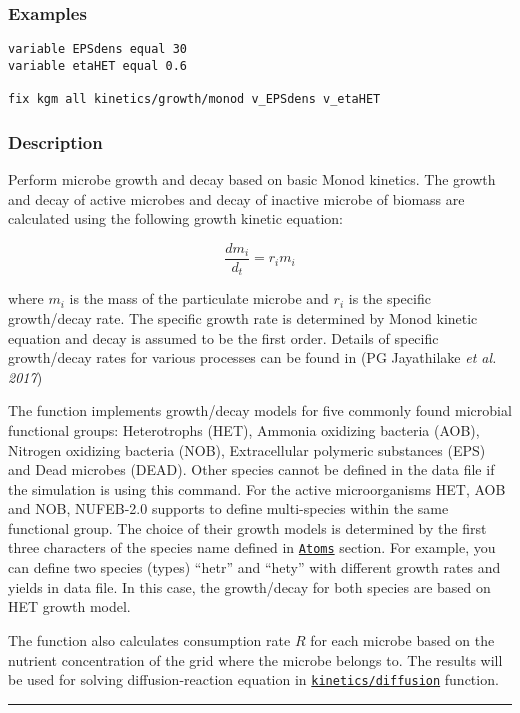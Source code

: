 \documentclass[11pt,a4paper,openright]{article}
\begin{document}
\subsubsection*{Examples}

\begin{Verbatim}[frame=single]
variable EPSdens equal 30
variable etaHET equal 0.6

fix kgm all kinetics/growth/monod v_EPSdens v_etaHET
\end{Verbatim}

\subsubsection*{Description}
Perform microbe growth and decay based on basic Monod kinetics.
The growth and decay of active microbes and decay of 
inactive microbe of biomass are calculated using the following growth kinetic equation: 

\[ \frac{dm_i}{d_t} = r_im_i \] 

where $m_i$ is the mass of the particulate microbe and $r_i$ is the specific growth/decay rate.
The specific growth rate is determined by Monod kinetic equation and decay is assumed to be the first order.
Details of specific growth/decay rates for various processes can be found in (PG Jayathilake {\it et al. 2017})

The function implements growth/decay models for five commonly found microbial functional groups:
Heterotrophs (HET), Ammonia oxidizing bacteria (AOB),
Nitrogen oxidizing bacteria (NOB), Extracellular polymeric substances (EPS)
and Dead microbes (DEAD). Other species cannot be defined in the data file if the simulation is using this command.
For the active microorganisms HET, AOB and NOB, 
NUFEB-2.0 supports to define multi-species within the same functional group. 
The choice of their growth models is determined by 
the first three characters of the species name defined in 
\hyperref[satom]{\tt Atoms} section.
For example, you can define two species (types) ``hetr'' and ``hety''
with different growth rates and yields in data file. 
In this case, the growth/decay for both species
are based on HET growth model. 

The function also calculates consumption rate $R$ for each microbe 
based on the nutrient concentration of the grid where the 
microbe belongs to. The results will be used for solving diffusion-reaction equation
in \hyperref[fkineticsdiffusion]{\tt kinetics/diffusion} function.

\noindent\rule{13cm}{0.4pt}
\end{document}
